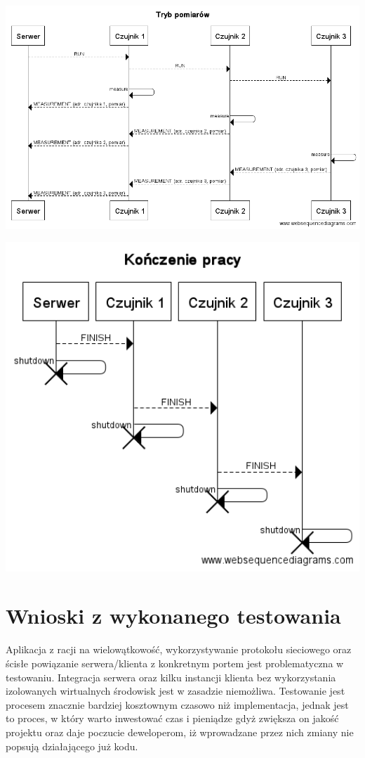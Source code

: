 \documentclass[a4paper,11pt]{article}
\begin{document}
\begin{center}
    \centerline{\includegraphics[width=1.4\textwidth]{measure_seq}}
    \centerline{\includegraphics[width=1.0\textwidth]{finish_seq}}
\end{center}
 
\section{Wnioski z wykonanego testowania} 
Aplikacja z racji na wielowątkowość, wykorzystywanie protokołu sieciowego oraz ścisłe powiązanie serwera/klienta z konkretnym portem jest problematyczna w testowaniu. Integracja serwera oraz kilku instancji klienta bez wykorzystania izolowanych wirtualnych środowisk jest w zasadzie niemożliwa. Testowanie jest procesem znacznie bardziej kosztownym czasowo niż implementacja, jednak jest to proces, w który warto inwestować czas i pieniądze gdyż zwiększa on jakość projektu oraz daje poczucie deweloperom, iż wprowadzane przez nich zmiany nie popsują działającego już kodu.
\end{document}
